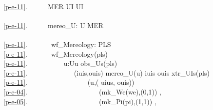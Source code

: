 \bp
\>\ \\
\ref{p-e-11}.\ \ \ \ \ \ MER {\EQ} UI {\TIMES} UI\\
\>\ \\
\ref{p-e-11}.\ \ \ \ \ \ mereo\_U: U {\RIGHTARROW} MER \\
\>\ \\
\ref{p-e-11}.\ \ \ \ \ \ \ wf\_Mereology: PLS {\RIGHTARROW}  \label{pipe:wfMereology}\\
\ref{p-e-11}.\ \ \ \ \ \ \ wf\_Mereology(pls) {\IS}\\
\ref{p-e-11}.\ \ \ \ \ \ \ \ \ \ {\ALL} u:U{\RDOT}u {\ISIN} obs\_Us(pls){\DBLRIGHTARROW} \\
\ref{p-e-11}.\ \ \ \ \ \ \ \ \ \ \ \ \  (iuis,ouis) {\EQ} mereo\_U(u)  iuis {\UNION} ouis {\SUBSETEQ} xtr\_UIs(pls) {\WEDGE}\\
\ref{p-e-11}.\ \ \ \ \ \ \ \ \ \ \ \ \ \ \ \ \  (u,( uius, ouis)) \\
\ref{p-e-04}.\ \ \ \ \ \ \ \ \ \ \ \ \ \ \ \ \ \ \ \ \ (mk\_We(we),(0,1)) {\RIGHTARROW} ,\\
\ref{p-e-05}.\ \ \ \ \ \ \ \ \ \ \ \ \ \ \ \ \ \ \ \ \ (mk\_Pi(pi),(1,1)) {\RIGHTARROW} ,\\
